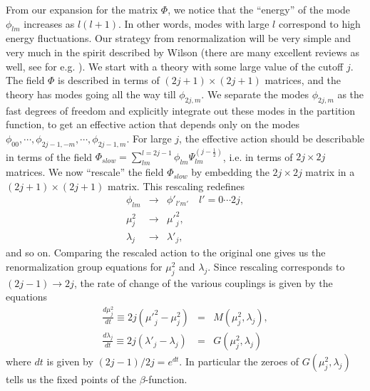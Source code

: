 \documentclass[a4paper,12pt]{article}
\numberwithin{equation}{section}
\begin{document}
From our expansion for the matrix $\Phi$, we notice that the
``energy'' of the mode $\phi_{lm}$ increases as $l(l+1)$. In other
words, modes with large $l$ correspond to high energy
fluctuations. Our strategy from renormalization will be very simple
and very much in the spirit described by Wilson \cite{wilkog} (there
are many excellent reviews as well, see for
e.g. \cite{goldenfeld,shankar}). We start with a theory with some
large value of the cutoff $j$. The field $\Phi$ is described in terms
of $(2j+1) \times (2j+1)$ matrices, and the theory has modes going all
the way till $\phi_{2j,m}$. We separate the modes $\phi_{2j,m}$ as the
fast degrees of freedom and explicitly integrate out these modes in
the partition function, to get an effective action that depends only
on the modes $\phi_{00}, \cdots, \phi_{2j-1,-m}, \cdots,
\phi_{2j-1,m}$. For large $j$, the effective action should be
describable in terms of the field $\Phi_{slow} = \sum_{lm}^{l=2j-1}
\phi_{lm}\Psi^{(j-\frac{1}{2})}_{lm}$, i.e. in terms of $2j \times 2j$
matrices. We now ``rescale'' the field $\Phi_{slow}$ by embedding the
$2j \times 2j$ matrix in a $(2j+1) \times (2j+1)$ matrix. This
rescaling redefines
\begin{eqnarray} 
\phi_{lm} &\rightarrow& \phi'_{l' m'} \quad l'=0 \cdots 2j, \\
\mu^2_j &\rightarrow& {\mu'}^2_j, \\
\lambda_j &\rightarrow& \lambda'_j,
\end{eqnarray} 
and so on. Comparing the rescaled action to the original one gives us
the renormalization group equations for $\mu^2_j$ and
$\lambda_j$. Since rescaling corresponds to $(2j-1) \rightarrow 2j$,
the rate of change of the various couplings is given by the equations
\begin{eqnarray} 
\frac{d \mu_j^2}{dt} \equiv 2j ({\mu'}_j^2 - \mu_j^2) &=& M(\mu_j^2,
\lambda_j), \\
\frac{d \lambda_j}{dt} \equiv 2j ({\lambda'}_j - \lambda_j) &=&
G(\mu_j^2, \lambda_j)
\end{eqnarray}
where $dt$ is given by $(2j-1)/2j = e^{dt}$. In particular the zeroes
of $G(\mu_j^2, \lambda_j)$ tells us the fixed points of the
$\beta$-function.
\end{document}
